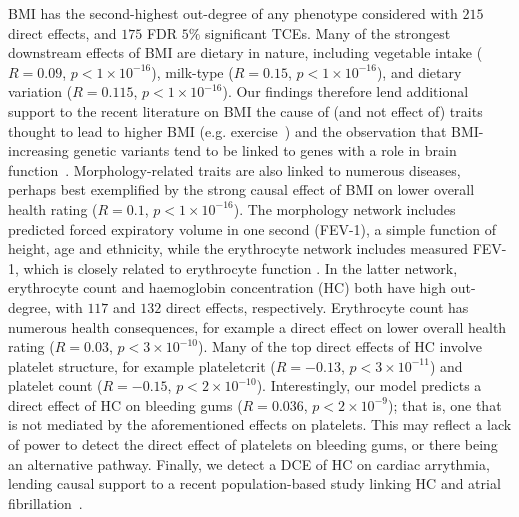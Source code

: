 \documentclass{article}
\begin{document}
BMI has the second-highest out-degree of any phenotype considered with
$215$ direct effects, and $175$ FDR $5\%$ significant TCEs.
Many of the strongest downstream effects of BMI are dietary
in nature, including vegetable intake ($R = 0.09$, $p < 1\times 10^{-16}$),
milk-type ($R = 0.15$, $p < 1\times 10^{-16}$), and dietary variation ($R = 0.115$, $p < 1\times 10^{-16}$).
Our findings therefore lend additional support to the recent literature on BMI the cause of (and not effect of)
traits thought to lead to higher BMI (e.g. exercise~\cite{Richmond2014}) and the observation that
BMI-increasing genetic variants tend to be linked to genes with a role in brain
function~\cite{Locke2015,Zhu2016,Ndiaye2020}. Morphology-related traits are also linked
to numerous diseases, perhaps best exemplified by the strong causal effect of BMI on lower overall
health rating ($R = 0.1$, $p < 1 \times 10^{-16}$). The
morphology network includes predicted forced expiratory volume in
one second (FEV-1), a simple function of height, age and ethnicity,
while the erythrocyte network includes measured FEV-1, which is closely related to
erythrocyte function . In the latter network, erythrocyte count and haemoglobin concentration (HC)
both have high out-degree, with $117$ and $132$ direct effects, respectively.
Erythrocyte count has numerous health consequences,
for example a direct effect on lower overall health rating ($R = 0.03$, $p < 3 \times 10^{-10}$).
Many of the top direct effects of HC involve platelet structure,
for example plateletcrit  ($R = -0.13$, $p < 3 \times 10^{-11}$) and platelet count
($R = -0.15$, $p < 2 \times 10^{-10}$). Interestingly, our model predicts a direct effect of
HC on bleeding gums ($R = 0.036$, $p < 2 \times 10^{-9}$); that is, one
that is not mediated by the aforementioned effects on platelets. This may reflect a lack of power to detect
the direct effect of platelets on bleeding gums, or there being an alternative pathway.
Finally, we detect a DCE of HC on cardiac arrythmia, lending causal
support to a recent population-based study linking HC and atrial fibrillation~\cite{Lim2020}.
\end{document}
